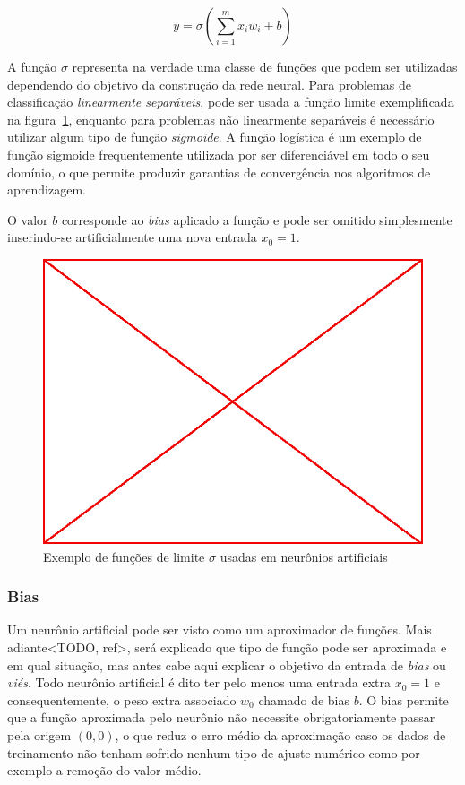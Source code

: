 $$y=\sigma(\sum_{i=1}^{m}x_i w_i + b)$$

A função $\sigma$ representa na verdade uma classe de funções que podem ser
utilizadas dependendo do objetivo da construção da rede neural. Para problemas
de classificação \emph{linearmente separáveis}, pode ser usada a função limite
exemplificada na figura~\ref{fig:lim-fun}, enquanto para problemas não
linearmente separáveis é necessário utilizar algum tipo de função
\emph{sigmoide}. A função logística é um exemplo de função sigmoide
frequentemente utilizada por ser diferenciável em todo o seu domínio, o que
permite produzir garantias de convergência nos algoritmos de aprendizagem.

O valor $b$ corresponde ao \emph{bias} aplicado a função e pode ser omitido
simplesmente inserindo-se artificialmente uma nova entrada $x_0 = 1$.

\begin{figure}\label{fig:lim-fun}
  \caption{Exemplo de funções de limite $\sigma$ usadas em neurônios artificiais}
  \begin{center}
    \includegraphics[scale=0.5]{placeholder}
  \end{center}
\end{figure}

\subsubsection{Bias}

Um neurônio artificial pode ser visto como um aproximador de funções. Mais
adiante<TODO, ref>, será explicado que tipo de função pode ser aproximada e em
qual situação, mas antes cabe aqui explicar o objetivo da entrada de
\emph{bias} ou \emph{viés}. Todo neurônio artificial é dito ter pelo menos uma
entrada extra $x_0 = 1$ e consequentemente, o peso extra associado $w_0$
chamado de bias $b$. O bias permite que a função aproximada pelo neurônio não
necessite obrigatoriamente passar pela origem $(0,0)$, o que reduz o erro médio
da aproximação caso os dados de treinamento não tenham sofrido nenhum tipo de
ajuste numérico como por exemplo a remoção do valor médio.

